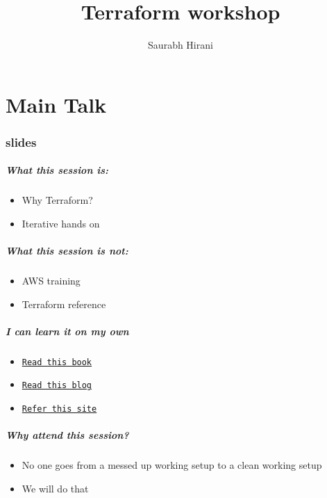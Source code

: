 \documentclass[9pt]{beamer}
\date{}
\title[Terraform workshop]{Terraform workshop}
\author[Saurabh Hirani]{Saurabh Hirani}
\institute[Autodesk]
{
\medskip
\myblue{\href{mailto:saurabh.hirani@gmail.com}{\texttt{saurabh.hirani@gmail.com}}} \\
}
\newcommand{\myblue} [1] {{\color{blue}#1}}
\begin{document}

\frame{\titlepage
}

\part<presentation>{Main Talk}

\section[slides]{slides}

\begin{frame}[fragile]
  \frametitle{What this session is:}

  \begin{itemize}[<+->]
    \item Why Terraform?
    \item Iterative hands on
  \end{itemize}

\end{frame}


\begin{frame}[fragile]
  \frametitle{What this session is not:}

  \begin{itemize}
    \item AWS training
    \item Terraform reference
  \end{itemize}

\end{frame}

\begin{frame}[fragile]
  \frametitle{I can learn it on my own}

  \begin{itemize}
    \item \myblue{\href{https://www.terraformupandrunning.com/}{\texttt{Read this book}}}
    \item \myblue{\href{https://blog.gruntwork.io/an-introduction-to-terraform-f17df9c6d180}{\texttt{Read this blog}}}
    \item \myblue{\href{https://terraform.io/}{\texttt{Refer this site}}}
  \end{itemize}
\end{frame}

\begin{frame}[fragile]
  \frametitle{Why attend this session?}

  \begin{itemize}[<+->]
    \item No one goes from a messed up working setup to a clean working setup
    \item We will do that
  \end{itemize}

\end{frame}
\end{document}
